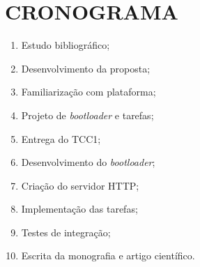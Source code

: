 
\chapter{CRONOGRAMA}
\begin{enumerate}
    \item Estudo bibliográfico; 
    \item Desenvolvimento da proposta;
    \item Familiarização com plataforma;
    \item Projeto de \textit{bootloader} e tarefas;
    \item Entrega do TCC1;
    \item Desenvolvimento do \textit{bootloader};
    \item Criação do servidor HTTP;
    \item Implementação das tarefas;
    \item Testes de integração;
    \item Escrita da monografia e artigo científico.
 \end{enumerate}
 
